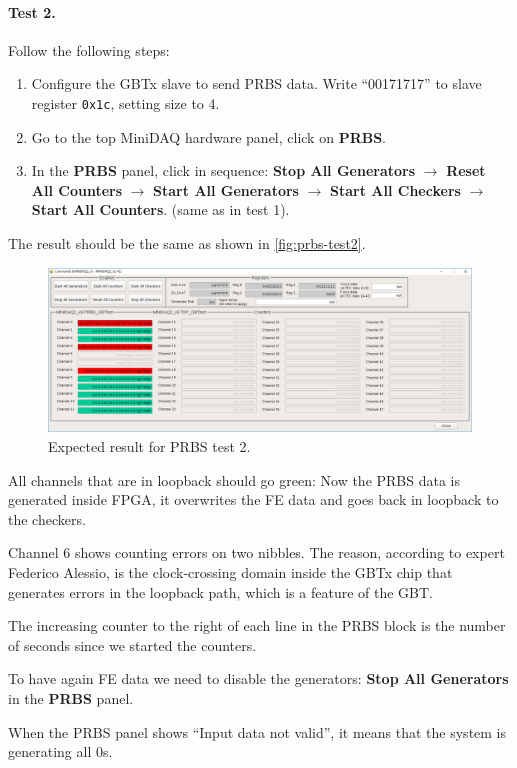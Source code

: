 \paragraph{Test 2.} Follow the following steps:
\begin{enumerate}
    \item Configure the GBTx slave to send PRBS data. Write ``00171717'' to
        slave register \texttt{0x1c}, setting size to 4.
    \item Go to the top MiniDAQ hardware panel, click on \textbf{PRBS}.
    \item In the \textbf{PRBS} panel, click in sequence:
        \textbf{Stop All Generators} $\to$ \textbf{Reset All Counters} $\to$
        \textbf{Start All Generators} $\to$ \textbf{Start All Checkers} $\to$
        \textbf{Start All Counters}. (same as in test 1).
\end{enumerate}

The result should be the same as shown in \autoref{fig:prbs-test2}.

\begin{figure}[ht]
    \centering
    \includegraphics[width=\textwidth]{res/prbs_test2.png}
    \caption{Expected result for PRBS test 2.}
    \label{fig:prbs-test2}
\end{figure}

\begin{leftbar}
    All channels that are in loopback should go green: Now the PRBS data is
    generated inside FPGA, it overwrites the FE data and goes back in loopback
    to the checkers.
\end{leftbar}

\begin{leftbar}
    Channel 6  shows counting errors on two nibbles.
    The reason, according to expert Federico Alessio, is the clock-crossing
    domain inside the GBTx chip that generates errors in the loopback path,
    which is a feature of the GBT.
\end{leftbar}

\begin{leftbar}
    The increasing counter to the right of each line in the PRBS block is the
    number of seconds since we started the counters.
\end{leftbar}

\begin{leftbar}
    To have again FE data we need to disable the generators:
    \textbf{Stop All Generators} in the \textbf{PRBS} panel.
\end{leftbar}

\begin{leftbar}
    When the PRBS panel shows ``Input data not valid'', it means that the
    system is generating all 0s.
\end{leftbar}
